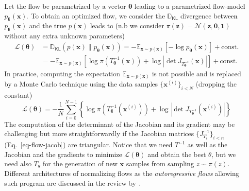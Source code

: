 \documentclass[11pt]{amsart}
\newcommand{\Esp}[0]{\ensuremath{\mathbb{E}}}
\newcommand{\DKL}[0]{\ensuremath{\mathbb{D}_{\mathsf{KL}}}}
\newcommand{\nn}{\nonumber}
\begin{document}
Let the flow be parametrized by a vector $\bm{\theta}$ leading to a parametrized flow-model $p_{\bm{\theta}}(\bm{x})$. To obtain an optimized flow, we consider the $\DKL$ divergence between  $p_{\bm{\theta}}(\bm{x})$ and the true $p(\bm{x})$ leads to (n.b we consider $\pi(\bm{z})=\mathcal{N}(\bm{z}, \bm{0}, \bm{1})$ without any extra unknown parameters)
\begin{align}
\mathcal{L}(\bm{\theta}) &= \DKL(p(\bm{x})\|p_{\bm{\theta}}(\bm{x}))
= - \Esp_{\bm{x}\sim p(\bm{x})}[-\log p_{\bm{\theta}}(\bm{x})] + \mathrm{const.} \nn \\
&= - \Esp_{\bm{x}\sim p(\bm{x})}[\log \pi(T_{\bm{\theta}}^{-1}(\bm{x}))+ \log |\det J_{T_{\bm{\theta}}^{-1}}(\bm{x})|] + \mathrm{const.} 
\end{align}
In practice, computing the expectation $\Esp_{\bm{x}\sim p(\bm{x})}$ is not possible 
and is replaced by a Monte Carlo technique using the data samples $\{\bm{x}^{(i)}\}_{i<N}$ (dropping the constant)
\begin{equation}
\mathcal{L}(\bm{\theta}) = -\frac{1}{N}\sum_{i=0}^{N-1} \left\{ \log \pi(T_{\bm{\theta}}^{-1}(\bm{x}^{(i)})) + \log |\det J_{T_{\bm{\theta}}^{-1}}(\bm{x}^{(i)})| \right\} 
\end{equation}
The computation of the  determinant of the Jacobian and its gradient may be challenging but more straightforwardly if the Jacobian matrices $\{J_{T_i}^{-1}\}_{i<n}$ (Eq.~\ref{eq-flow-jacob}) are triangular. Notice that we need $T^{-1}$ as well as the Jacobian and the gradients to minimize $\mathcal{L}(\bm{\theta})$ and obtain the  best $\theta$, but we need also $T_\theta$ for the generation of new $\bm{x}$ samples from sampling $z\sim \pi(z)$. Different architectures of normalizing flows as the \textit{autoregressive flows} allowing such program are discussed in the review by \cite{Papamakarios2021}. 
\end{document}
